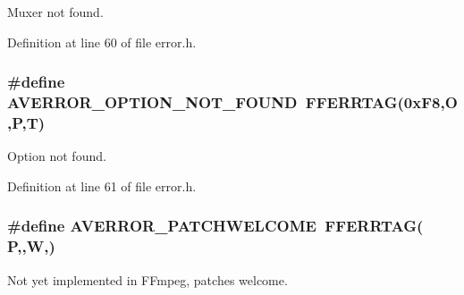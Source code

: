 Muxer not found. 



Definition at line 60 of file error.\+h.

\subsubsection[{\texorpdfstring{A\+V\+E\+R\+R\+O\+R\+\_\+\+O\+P\+T\+I\+O\+N\+\_\+\+N\+O\+T\+\_\+\+F\+O\+U\+ND}{AVERROR_OPTION_NOT_FOUND}}]{\setlength{\rightskip}{0pt plus 5cm}\#define A\+V\+E\+R\+R\+O\+R\+\_\+\+O\+P\+T\+I\+O\+N\+\_\+\+N\+O\+T\+\_\+\+F\+O\+U\+ND~{\bf F\+F\+E\+R\+R\+T\+AG}(0x\+F8,\textquotesingle{}\+O\textquotesingle{},\textquotesingle{}\+P\textquotesingle{},\textquotesingle{}\+T\textquotesingle{})}\hypertarget{group__lavu__error_gaf5a8745befceddae26f2dc11ecf21679}{}\label{group__lavu__error_gaf5a8745befceddae26f2dc11ecf21679}


Option not found. 



Definition at line 61 of file error.\+h.

\subsubsection[{\texorpdfstring{A\+V\+E\+R\+R\+O\+R\+\_\+\+P\+A\+T\+C\+H\+W\+E\+L\+C\+O\+ME}{AVERROR_PATCHWELCOME}}]{\setlength{\rightskip}{0pt plus 5cm}\#define A\+V\+E\+R\+R\+O\+R\+\_\+\+P\+A\+T\+C\+H\+W\+E\+L\+C\+O\+ME~{\bf F\+F\+E\+R\+R\+T\+AG}( \textquotesingle{}P\textquotesingle{},\textquotesingle{},\textquotesingle{}W\textquotesingle{},\textquotesingle{})}\hypertarget{group__lavu__error_ga67a27567a9e5b7037fee072fbcc34dbf}{}\label{group__lavu__error_ga67a27567a9e5b7037fee072fbcc34dbf}


Not yet implemented in F\+Fmpeg, patches welcome. 




